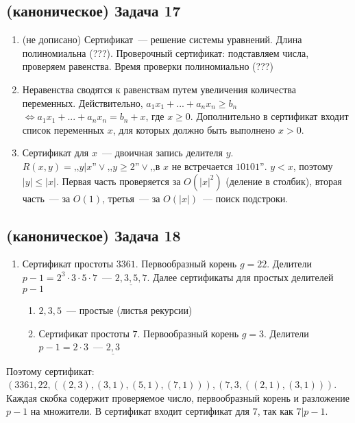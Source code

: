 \documentclass[a4paper]{article}
\begin{document}
\subsection*{(каноническое) Задача 17}
\begin{enumerate}
\item (не дописано) Сертификат~--- решение системы уравнений. Длина полиномиальна (???). Проверочный сертификат: подставляем числа, проверяем равенства. Время проверки полиномиально (???)
\item Неравенства сводятся к равенствам путем увеличения количества переменных. Действительно, $a_1x_1+...+a_nx_n\geqslant b_n$ $\Leftrightarrow a_1x_1+...+a_nx_n=b_n+x$, где $x\geqslant 0$. Дополнительно в сертификат входит список переменных $x$, для которых должно быть выполнено $x>0$.
\item Сертификат для $x$~--- двоичная запись делителя $y$. $R(x,y)=\mbox{,,}y|x\mbox{''}\vee\mbox{,,}y\geqslant 2\mbox{''}\vee \mbox{,,}\mbox{в }x\mbox{ не встречается } 10101\mbox{''}$. $y<x$, поэтому $|y|\leqslant|x|$. Первая часть проверяется за $O(|x|^2)$ (деление в столбик), вторая часть~--- за $O(1)$, третья~--- за $O(|x|)$~--- поиск подстроки.
\end{enumerate}
\subsection*{(каноническое) Задача 18}
\begin{enumerate}
\item Сертификат простоты $3361$. Первообразный корень $g=22$. Делители $p-1=2^3\cdot 3\cdot 5\cdot 7$~--- $\underline{2,3,5,7}$. Далее сертификаты для простых делителей $p-1$\begin{enumerate}
\item $2,3,5$~--- простые (листья рекурсии)
\item Сертификат простоты $7$. Первообразный корень $g=3$. Делители $p-1=2\cdot 3$~--- $\underline{2,3}$
\end{enumerate}
\end{enumerate}
Поэтому сертификат: $(3361, 22, ((2,3),(3,1),(5,1),(7,1))), (7, 3, ((2, 1), (3, 1)))$. Каждая скобка содержит проверяемое число, первообразный корень и разложение $p-1$ на множители. В сертификат входит сертификат для $7$, так как $7|p-1$.
\end{document}

